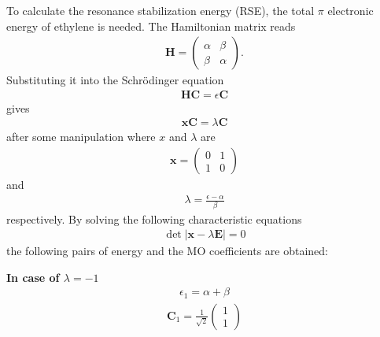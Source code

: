 \documentclass{jlreq}
\begin{document}
To calculate the resonance stabilization energy (RSE), the total $\pi$ electronic energy of ethylene is needed. The Hamiltonian matrix reads
\begin{eqnarray}
    \mathbf{H}=
    \begin{pmatrix}
        \alpha & \beta \\
        \beta & \alpha
    \end{pmatrix}.   
\end{eqnarray}  
Substituting it into the Schr\"odinger equation 
\begin{eqnarray}
    \mathbf{HC}=\epsilon\mathbf{C}
\end{eqnarray}  
gives
\begin{eqnarray}
    \mathbf{xC}=\lambda\mathbf{C}
\end{eqnarray}
after some manipulation where $x$ and $\lambda$ are
\begin{eqnarray}
    \mathbf{x}=
    \begin{pmatrix}
        0 & 1 \\
        1 & 0
    \end{pmatrix}
\end{eqnarray}
and
\begin{eqnarray}
\lambda=\frac{\epsilon-\alpha}{\beta}
\end{eqnarray}  
respectively. By solving the following characteristic equations
\begin{eqnarray}
    \det|\mathbf{x}-\lambda\mathbf{E}|=0
\end{eqnarray}  
the following pairs of energy and the MO coefficients are obtained:

\noindent
\textbf{In case of $\lambda=-1$}\\
\begin{eqnarray}
    \epsilon_1=\alpha+\beta
\end{eqnarray}  
\begin{eqnarray}
    \mathbf{C}_1=\frac{1}{\sqrt{2}}
    \begin{pmatrix}
        1 \\
        1
    \end{pmatrix}   
\end{eqnarray}
\end{document}
